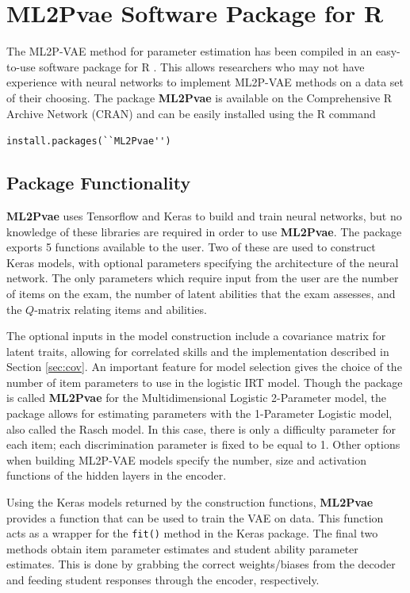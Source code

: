 \section{\textbf{ML2Pvae} Software Package for R}
The ML2P-VAE method for parameter estimation has been compiled in an easy-to-use software package for R \cite{r_package}. This allows researchers who may not have experience with neural networks to implement ML2P-VAE methods on a data set of their choosing. The package \textbf{ML2Pvae} is available on the Comprehensive R Archive Network (CRAN) and can be easily installed using the R command 
\begin{center}
\verb!install.packages(``ML2Pvae'')! 
\end{center}

\subsection{Package Functionality}
\textbf{ML2Pvae} uses Tensorflow and Keras to build and train neural networks, but no knowledge of these libraries are required in order to use \textbf{ML2Pvae}. The package exports 5 functions available to the user. Two of these are used to construct Keras models, with optional parameters specifying the architecture of the neural network. The only parameters which require input from the user are the number of items on the exam, the number of latent abilities that the exam assesses, and the $Q$-matrix relating items and abilities.

The optional inputs in the model construction include a covariance matrix for latent traits, allowing for correlated skills and the implementation described in Section \ref{sec:cov}. An important feature for model selection gives the choice of the number of item parameters to use in the logistic IRT model. Though the package is called \textbf{ML2Pvae} for the Multidimensional Logistic 2-Parameter model, the package allows for estimating parameters with the 1-Parameter Logistic model, also called the Rasch model. In this case, there is only a difficulty parameter for each item; each  discrimination parameter is fixed to be equal to 1. Other options when building ML2P-VAE models specify the number, size and activation functions of the hidden layers in the encoder.

Using the Keras models returned by the construction functions, \textbf{ML2Pvae} provides a function that can be used to train the VAE on data. This function acts as a wrapper for the \verb!fit()! method in the Keras package. The final two methods obtain item parameter estimates and student ability parameter estimates. This is done by grabbing the correct weights/biases from the decoder and feeding student responses through the encoder, respectively. 

